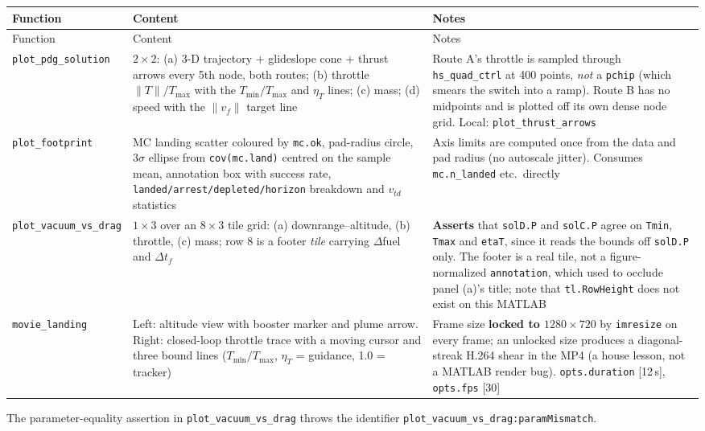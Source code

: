 \documentclass[11pt]{article}
\newcommand{\Tmin}{T_{\min}}
\newcommand{\Tmax}{T_{\max}}
\newcommand{\etaT}{\eta_T}
\begin{document}
\begin{center}
\begin{longtable}{@{}L{4.4cm}L{4.8cm}L{5.6cm}@{}}
\toprule
Function & Content & Notes \\
\midrule
\endfirsthead
\toprule
Function & Content & Notes \\
\midrule
\endhead
\texttt{plot\_pdg\_solution} &
$2\times2$: (a) 3-D trajectory + glideslope cone + thrust arrows every 5th
node, both routes; (b) throttle $\lVert T\rVert/\Tmax$ with the
$\Tmin/\Tmax$ and $\etaT$ lines; (c) mass; (d) speed with the $\lVert
v_f\rVert$ target line &
Route A's throttle is sampled through \texttt{hs\_quad\_ctrl} at 400 points,
\emph{not} a \texttt{pchip} (which smears the switch into a ramp). Route B
has no midpoints and is plotted off its own dense node grid. Local:
\texttt{plot\_thrust\_arrows} \\
\texttt{plot\_footprint} &
MC landing scatter coloured by \texttt{mc.ok}, pad-radius circle,
$3\sigma$ ellipse from \texttt{cov(mc.land)} centred on the sample mean,
annotation box with success rate,
\texttt{landed/arrest/depleted/horizon} breakdown
and $v_{td}$ statistics &
Axis limits are computed once from the data and pad radius (no autoscale
jitter). Consumes \texttt{mc.n\_landed} etc.\ directly \\
\texttt{plot\_vacuum\_vs\_drag} &
$1\times3$ over an $8\times3$ tile grid: (a) downrange--altitude, (b)
throttle, (c) mass; row 8 is a footer \emph{tile} carrying
$\Delta$fuel and $\Delta t_f$ &
\textbf{Asserts} that \texttt{solD.P} and \texttt{solC.P} agree on
\texttt{Tmin}, \texttt{Tmax} and \texttt{etaT}, since it reads the bounds
off \texttt{solD.P} only. The footer is a real tile, not a
figure-normalized \texttt{annotation}, which used to occlude panel (a)'s
title; note that \texttt{tl.RowHeight} does not exist on this MATLAB \\
\texttt{movie\_landing} &
Left: altitude view with booster marker and plume arrow. Right: closed-loop
throttle trace with a moving cursor and three bound lines
($\Tmin/\Tmax$, $\etaT$ = guidance, 1.0 = tracker) &
Frame size \textbf{locked to $1280\times720$} by \texttt{imresize} on every
frame; an unlocked size produces a diagonal-streak H.264 shear in the MP4
(a house lesson, not a MATLAB render bug). \texttt{opts.duration} [12\,s],
\texttt{opts.fps} [30] \\
\bottomrule
\end{longtable}
\end{center}

The parameter-equality assertion in \texttt{plot\_vacuum\_vs\_drag} throws
the identifier \texttt{plot\_vacuum\_vs\_drag:paramMismatch}.
\end{document}
